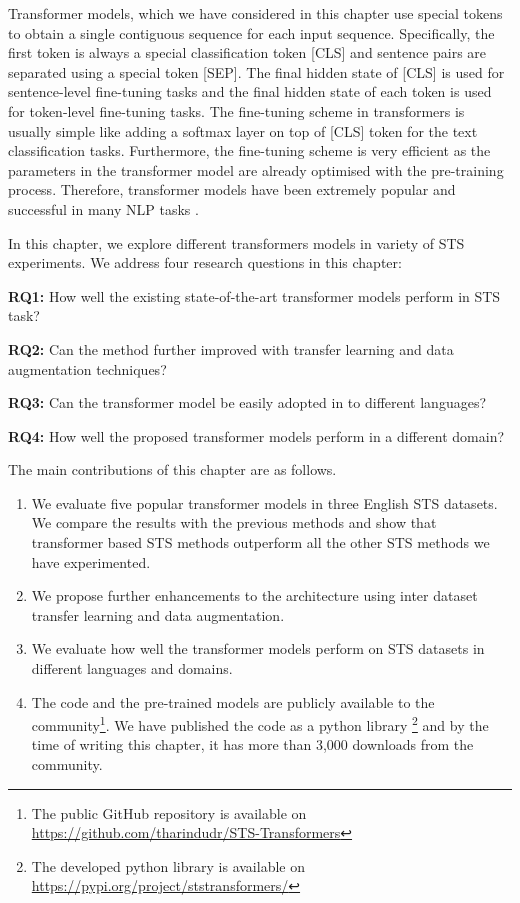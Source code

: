 Transformer models, which we have considered in this chapter use special tokens to obtain a single contiguous sequence for each input sequence. Specifically, the first token is always a special classification token \textsc{[CLS]} and sentence pairs are separated using a special token \textsc{[SEP]}. The final hidden state of \textsc{[CLS]}  is used for sentence-level fine-tuning tasks and the final hidden state of each token is used for token-level fine-tuning tasks. The fine-tuning scheme in transformers is usually simple like adding a softmax layer on top of \textsc{[CLS]} token for the text classification tasks. Furthermore, the fine-tuning scheme is very efficient as the parameters in the transformer model are already optimised with the pre-training process. Therefore, transformer models have been extremely popular and successful in many NLP tasks \autocite{devlin-etal-2019-bert}. 

In this chapter, we explore different transformers models in variety of STS experiments. 
We address four research questions in this chapter:

\textbf{RQ1:} How well the existing state-of-the-art transformer models perform in STS task? 

\textbf{RQ2:} Can the method further improved with transfer learning and data augmentation techniques?

\textbf{RQ3:} Can the transformer model be easily adopted in to different languages?

\textbf{RQ4:} How well the proposed transformer models perform in a different domain? 

The main contributions of this chapter are as follows.

\begin{enumerate}
\item We evaluate five popular transformer models in three English STS datasets. We compare the results with the previous methods and show that transformer based STS methods outperform all the other STS methods we have experimented.

\item We propose further enhancements to the architecture using inter dataset transfer learning and data augmentation.  

\item We evaluate how well the transformer models perform on STS datasets in different languages and domains. 

\item The code and the pre-trained models are publicly available to the community\footnote{The public GitHub repository is available on \url{https://github.com/tharindudr/STS-Transformers}}. We have published the code as a python library \footnote{The developed python library is available on \url{https://pypi.org/project/ststransformers/}} and by the time of writing this chapter, it has more than 3,000 downloads from the community. 

\end{enumerate}

